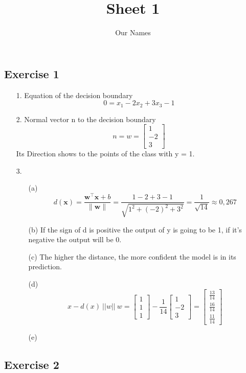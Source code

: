 \documentclass[12pt]{article}
\title{ Sheet 1 }
\author{Our Names}
\begin{document}
\maketitle

\vspace{0.5in}



\subsection*{Exercise 1}
\begin{itemize}

\item[1.] Equation of the decision boundary $$0 = x_1 -2x_2 + 3x_3 - 1$$
\item[2.] Normal vector n to the decision boundary 
\[n = w = \begin{bmatrix} 1 \\ -2 \\ 3 \end{bmatrix}\] 
Its Direction shows to the points of the class with y = 1.
\vspace{1cm} %
\item[3.]
\begin{itemize}
\item[(a)] \[
d(\mathbf{x}) = \frac{\mathbf{w}^\top \mathbf{x} + b}{\|\mathbf{w}\|} = \frac{1-2+3-1}{\sqrt{1^2+(-2)^2+3^2}} = \frac{1}{\sqrt{14}} \approx 0,267 
\]
\vspace{1cm} %
\item[(b)] If the sign of d is positive the output of y is going to be 1, if it's negative the output will be 0.
\vspace{1cm} %
\item[(c)] The higher the distance, the more confident the model is in its prediction.
\vspace{1cm} %
\item[(d)] \[
x - d(x) \ ||w|| \ w = \begin{bmatrix} 1 \\ 1 \\ 1 \end{bmatrix} - \frac{1}{14}  \begin{bmatrix} 1 \\ -2 \\ 3 \end{bmatrix} = \begin{bmatrix} \frac{13}{14} \\ \frac{16}{14} \\ \frac{11}{14} \end{bmatrix}
\]
\vspace{1cm} %
\item[(e)] 
\vspace{1cm} %
\end{itemize}
\end{itemize}

\subsection*{Exercise 2}

\vspace{2in} %
\end{document}

